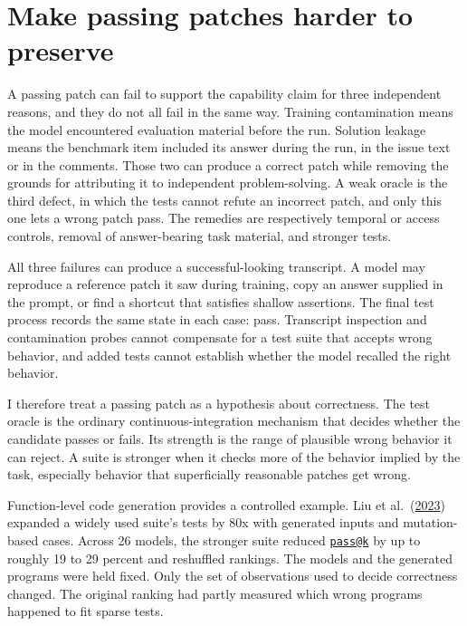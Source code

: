 \section{Make passing patches harder to preserve}\label{make-passing-patches-harder-to-preserve}

A passing patch can fail to support the capability claim for three independent reasons, and they do not all fail in the same way. Training contamination means the model encountered evaluation material before the run. Solution leakage means the benchmark item included its answer during the run, in the issue text or in the comments. Those two can produce a correct patch while removing the grounds for attributing it to independent problem-solving. A weak oracle is the third defect, in which the tests cannot refute an incorrect patch, and only this one lets a wrong patch pass. The remedies are respectively temporal or access controls, removal of answer-bearing task material, and stronger tests.

All three failures can produce a successful-looking transcript. A model may reproduce a reference patch it saw during training, copy an answer supplied in the prompt, or find a shortcut that satisfies shallow assertions. The final test process records the same state in each case: pass. Transcript inspection and contamination probes cannot compensate for a test suite that accepts wrong behavior, and added tests cannot establish whether the model recalled the right behavior.

I therefore treat a passing patch as a hypothesis about correctness. The test oracle is the ordinary continuous-integration mechanism that decides whether the candidate passes or fails. Its strength is the range of plausible wrong behavior it can reject. A suite is stronger when it checks more of the behavior implied by the task, especially behavior that superficially reasonable patches get wrong.

Function-level code generation provides a controlled example. Liu et al.~(\href{https://arxiv.org/abs/2305.01210}{2023}) expanded a widely used suite's tests by 80x with generated inputs and mutation-based cases. Across 26 models, the stronger suite reduced \href{mailto:pass@k}{\nolinkurl{pass@k}} by up to roughly 19 to 29 percent and reshuffled rankings. The models and the generated programs were held fixed. Only the set of observations used to decide correctness changed. The original ranking had partly measured which wrong programs happened to fit sparse tests.

